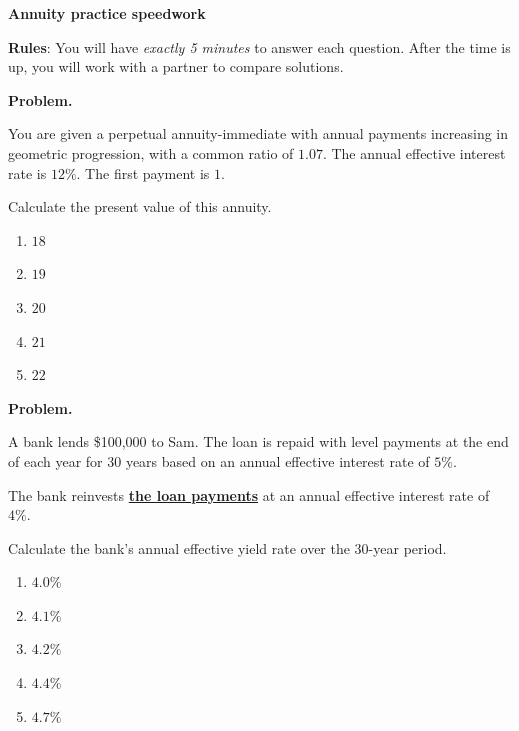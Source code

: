 \documentclass[11pt]{article}
\begin{document}
\begin{center}
{\Huge \textbf{Annuity practice speedwork}}\\
\vspace{0.3em}
\end{center}


\bigskip

\bigskip

\bigskip

\bigskip
\bigskip

\bigskip

\bigskip

\bigskip

\begin{center}
    \begin{Large}
        \textbf{Rules}: You will have \textit{exactly 5 minutes} to answer each question. After the time is up, you will work with a partner to compare solutions.
    \end{Large}
\end{center}


\newpage


\textbf{Problem.}

You are given a perpetual annuity-immediate with annual payments increasing in geometric progression, with a common ratio of $1.07$. The annual effective interest rate is $12\%$. The first payment is $1$.

Calculate the present value of this annuity.

\begin{enumerate}[label=\Alph*.]
    \item $18$
    \item $19$
    \item $20$
    \item $21$
    \item $22$
\end{enumerate}


\newpage

\textbf{Problem.}

A bank lends \$100{,}000 to Sam. The loan is repaid with level payments at the end of each year for 30 years based on an annual effective interest rate of $5\%$.

The bank reinvests \underline{\textbf{the loan payments}} at an annual effective interest rate of $4\%$.

Calculate the bank's annual effective yield rate over the 30-year period.

\begin{enumerate}[label=\Alph*.]
    \item $4.0\%$
    \item $4.1\%$
    \item $4.2\%$
    \item $4.4\%$
    \item $4.7\%$ %
\end{enumerate}
\end{document}
